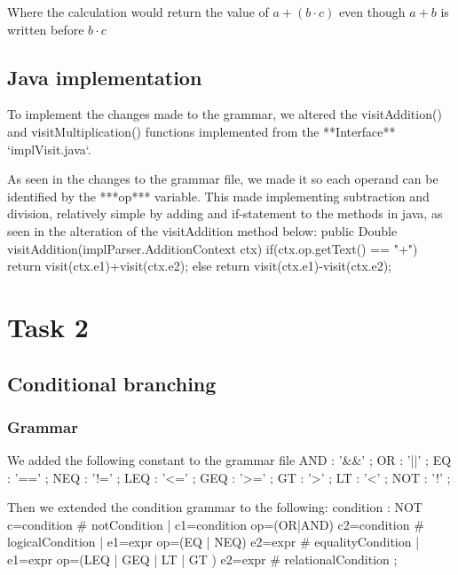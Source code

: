 \documentclass[a4paper]{article}
\newenvironment{code}%
   {\snugshade\verbatim}%
   {\endverbatim\endsnugshade}
\begin{document}
Where the calculation would return the value of $a + (b \cdot c)$ even though $a + b$ is written before $b \cdot c$

\subsection{Java implementation}
To implement the changes made to the grammar, we altered the visitAddition() and visitMultiplication() functions implemented from the **Interface** `implVisit.java`.

As seen in the changes to the grammar file, we made it so each operand can be identified by the ***op*** variable. This made implementing
subtraction and division, relatively simple by adding and if-statement to the methods in java, as seen in the alteration of the visitAddition method below:
\begin{code}
public Double visitAddition(implParser.AdditionContext ctx) {
if(ctx.op.getText() == "+")
  return visit(ctx.e1)+visit(ctx.e2);
else
  return visit(ctx.e1)-visit(ctx.e2);
}
\end{code}
  
\section{ Task 2 }

\subsection{Conditional branching}
  
\subsubsection{Grammar}
We added the following constant to the grammar file
\begin{code}
AND   : '&&'   ;
OR    : '||'   ;
EQ    : '=='   ;
NEQ   : '!='   ;
LEQ   : '<='   ;
GEQ   : '>='   ;
GT    : '>'    ;
LT    : '<'    ;
NOT   : '!'    ;
\end{code}

Then we extended the condition grammar to the following:
\begin{code}
condition 
    : NOT c=condition                           # notCondition
    | c1=condition op=(OR|AND) c2=condition     # logicalCondition
    | e1=expr op=(EQ | NEQ) e2=expr             # equalityCondition
    | e1=expr op=(LEQ | GEQ | LT | GT ) e2=expr # relationalCondition
    ; 
\end{code}
\end{document}
